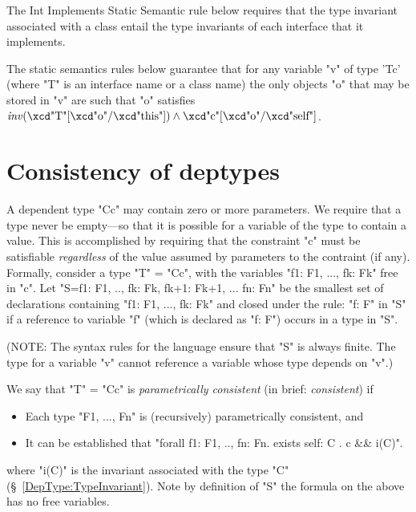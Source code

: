 The {\sc Int Implements} Static Semantic rule below requires that the
type invariant associated with a class entail the type invariants of
each interface that it implements.

The static semantics rules below guarantee that for any variable \xcd"v" of
type \xcd'T{c}' (where \xcd"T" is an interface name or a class name) the only
objects \xcd"o" that may be stored in \xcd"v" are such that \xcd"o" satisfies
$\mathit{inv}(\mbox{\xcd"T"}[\mbox{\xcd"o"}/\mbox{\xcd"this"}])
\wedge \mbox{\xcd"c"}[\mbox{\xcd"o"}/\mbox{\xcd"self"}]$.


\section{Consistency of deptypes}\label{DepType:Consistency}

A dependent type \xcd"C{c}" may contain zero or more parameters. We require
that a type never be empty---so that it is possible for a variable of
the type to contain a value. This is accomplished by requiring that
the constraint \xcd"c" must be satisfiable {\em regardless} of the value assumed
by parameters to the contraint (if any). Formally, consider a type
\xcd"T" = \xcd"C{c}", with the variables \xcd"f1: F1, ..., fk: Fk"
free in \xcd"c".  Let 
\xcd"S={f1: F1, .., fk: Fk, fk+1: Fk+1, ... fn: Fn}" be the smallest set of
declarations containing \xcd"f1: F1, ..., fk: Fk" and closed under the rule:
\xcd"f: F" in \xcd"S" if a reference to variable \xcd"f" (which
is declared as \xcd"f: F") occurs in a type in \xcd"S".

(NOTE: The syntax rules for the language ensure that \xcd"S" is always
finite. The type for a variable \xcd"v" cannot reference a variable whose
type depends on \xcd"v".)

We say that \xcd"T" = \xcd"C{c}" is {\em parametrically consistent} (in brief:
{\em consistent}) if

\begin{itemize}
  \item Each type \xcd"F1, ..., Fn" is (recursively) parametrically consistent, and
\item It can be established that \xcd"forall f1: F1, .., fn: Fn.  exists self: C . c && i(C)".
\end{itemize}
\noindent where \xcd"i(C)" is the invariant associated with the type \xcd"C"
(\S~\ref{DepType:TypeInvariant}).  Note by definition of \xcd"S" the formula on the
above has no free variables.

